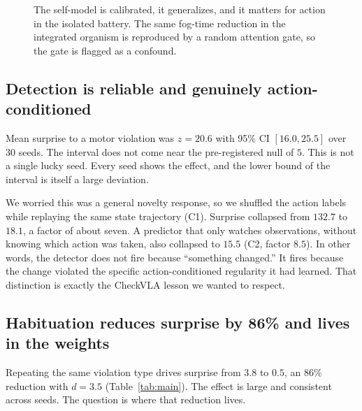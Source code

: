 \documentclass[11pt,a4paper]{article}
\begin{document}
\begin{figure}[h]
\centering
{}
\caption{The self-model is calibrated, it generalizes, and it matters for action in the isolated battery. The same fog-time reduction in the integrated organism is reproduced by a random attention gate, so the gate is flagged as a confound.}
\label{fig:phi}
\end{figure}

\subsection{Detection is reliable and genuinely action-conditioned}

Mean surprise to a motor violation was $z=20.6$ with 95\% CI $[16.0, 25.5]$ over 30 seeds. The interval does not come near the pre-registered null of $5$. This is not a single lucky seed. Every seed shows the effect, and the lower bound of the interval is itself a large deviation.

We worried this was a general novelty response, so we shuffled the action labels while replaying the same state trajectory (C1). Surprise collapsed from $132.7$ to $18.1$, a factor of about seven. A predictor that only watches observations, without knowing which action was taken, also collapsed to $15.5$ (C2, factor $8.5$). In other words, the detector does not fire because ``something changed.'' It fires because the change violated the specific action-conditioned regularity it had learned. That distinction is exactly the CheckVLA lesson we wanted to respect.

\subsection{Habituation reduces surprise by 86\% and lives in the weights}

Repeating the same violation type drives surprise from $3.8$ to $0.5$, an 86\% reduction with $d=3.5$ (Table~\ref{tab:main}). The effect is large and consistent across seeds. The question is where that reduction lives.
\end{document}
